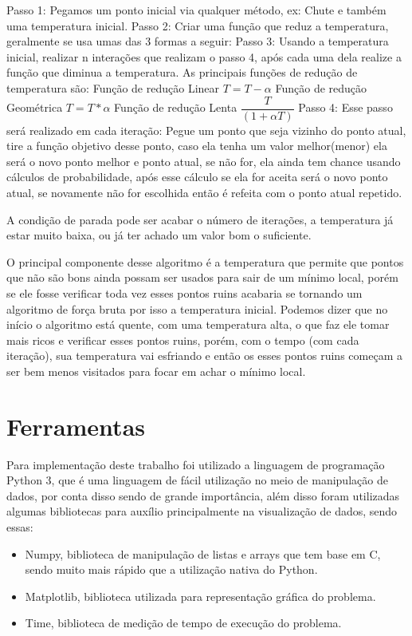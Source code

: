 \documentclass{article}
\begin{document}
\begin{outline}[enumerate]
    \1 Passo 1: Pegamos um ponto inicial via qualquer método, ex: Chute e também uma temperatura inicial.
    \1 Passo 2: Criar uma função que reduz a temperatura, geralmente se usa umas das 3 formas a seguir:
    \1 Passo 3: Usando a temperatura inicial, realizar n interações que realizam o passo 4, após cada uma dela realize a função que diminua a temperatura. As principais funções de redução de temperatura são:
    \2 Função de redução Linear
    \3 $T = T - \alpha$
    \2 Função de redução Geométrica
    \3 $T = T * \alpha$
    \2 Função de redução Lenta
    \3 $\dfrac{T}{(1 + \alpha T)}$
    \1 Passo 4: Esse passo será realizado em cada iteração: Pegue um ponto que seja vizinho do ponto atual, tire a função objetivo desse ponto, caso ela tenha um valor melhor(menor) ela será o novo ponto melhor e ponto atual, se não for, ela ainda tem chance usando cálculos de probabilidade, após esse cálculo se ela for aceita será o novo ponto atual, se novamente não for escolhida então é refeita com o ponto atual repetido.
  \end{outline}

A condição de parada pode ser acabar o número de iterações, a temperatura já estar muito baixa,  ou já ter achado um valor bom o suficiente.

O principal componente desse algoritmo é a temperatura que permite que pontos que não são bons ainda possam ser usados para sair de um mínimo local, porém se ele fosse verificar toda vez esses pontos ruins acabaria se tornando um algoritmo de força bruta por isso a temperatura inicial. Podemos dizer que no início o algoritmo está quente, com uma temperatura alta, o que faz ele tomar  mais ricos e verificar esses pontos ruins, porém, com o  tempo (com cada iteração), sua temperatura vai esfriando e então os esses pontos ruins começam a ser bem menos visitados para focar em achar o mínimo local.

\section{Ferramentas}
Para implementação deste trabalho foi utilizado a linguagem de programação Python 3, que é uma linguagem de fácil utilização no meio de manipulação de dados, por conta disso sendo de grande importância, além disso foram utilizadas algumas bibliotecas para auxílio principalmente na visualização de dados, sendo essas:

    \begin{itemize}
        \item Numpy, biblioteca de manipulação de listas e arrays que tem base em C, sendo muito mais rápido que a utilização nativa do Python.
        \item Matplotlib, biblioteca utilizada para representação gráfica do problema.
        \item Time, biblioteca de medição de tempo de execução do problema.
    \end{itemize}
\end{document}
